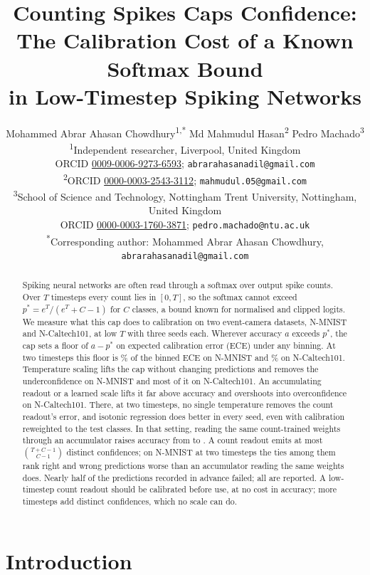 \documentclass[10pt]{article}
\title{Counting Spikes Caps Confidence:\\ The Calibration Cost of a Known Softmax Bound\\
in Low-Timestep Spiking Networks}
\author{Mohammed Abrar Ahasan Chowdhury\textsuperscript{1,*}\quad
  Md Mahmudul Hasan\textsuperscript{2}\quad
  Pedro Machado\textsuperscript{3}\\[6pt]
  \small \textsuperscript{1}Independent researcher, Liverpool, United Kingdom\\
  \small ORCID \href{https://orcid.org/0009-0006-9273-6593}{0009-0006-9273-6593};
  \texttt{abrarahasanadil@gmail.com}\\[3pt]
  \small \textsuperscript{2}ORCID \href{https://orcid.org/0000-0003-2543-3112}{0000-0003-2543-3112};
  \texttt{mahmudul.05@gmail.com}\\[3pt]
  \small \textsuperscript{3}School of Science and Technology, Nottingham Trent University,
  Nottingham, United Kingdom\\
  \small ORCID \href{https://orcid.org/0000-0003-1760-3871}{0000-0003-1760-3871};
  \texttt{pedro.machado@ntu.ac.uk}\\[3pt]
  \small \textsuperscript{*}Corresponding author: Mohammed Abrar Ahasan Chowdhury,
  \texttt{abrarahasanadil@gmail.com}}
\date{}
\begin{document}
\maketitle

\begin{abstract}
Spiking neural networks are often read through a softmax over output spike counts. Over $T$ timesteps every count lies in $[0,T]$, so the softmax
cannot exceed $p^{*}=e^{T}/(e^{T}+C-1)$ for $C$ classes, a bound known for normalised and clipped
logits. We measure what this cap does to calibration on two event-camera datasets, N-MNIST and
N-Caltech101, at low $T$ with three seeds each.
Wherever accuracy $a$ exceeds $p^{*}$, the cap sets a floor of $a-p^{*}$ on expected calibration
error (ECE) under any binning. At two timesteps this floor is \frNmTwoInt\% of the binned ECE %
on N-MNIST and \frNcTwoInt\% on N-Caltech101. Temperature scaling lifts the cap without %
changing predictions and removes the underconfidence on N-MNIST and most of it on N-Caltech101.
An accumulating readout or a learned scale lifts it far above accuracy and overshoots into
overconfidence on N-Caltech101. There, at two timesteps, no single temperature removes the count readout's error,
and isotonic regression does better in every seed, even with calibration reweighted to the test
classes. In that setting, reading the same count-trained weights through an accumulator
raises accuracy from \swNcTwoCountAcc{} to \swNcTwoAccumAcc. A count readout emits at most %
$\binom{T+C-1}{C-1}$ distinct confidences; on N-MNIST at two timesteps the ties among them rank
right and wrong predictions worse than an accumulator reading the same weights does. Nearly half of the predictions recorded in
advance failed; all are reported. A low-timestep count readout should be calibrated before use,
at no cost in accuracy; more timesteps add distinct confidences, which no scale can do.
\end{abstract}


\section{Introduction}
\label{sec:intro}
\end{document}
